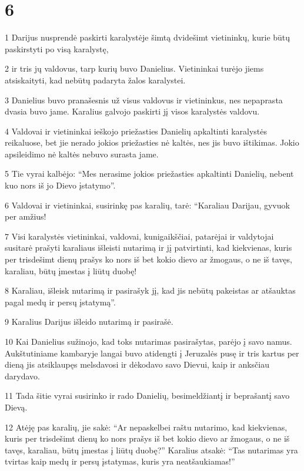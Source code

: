 \chapter{6}


\par 1 Darijus nusprendė paskirti karalystėje šimtą dvidešimt vietininkų, kurie būtų paskirstyti po visą karalystę, 
\par 2 ir tris jų valdovus, tarp kurių buvo Danielius. Vietininkai turėjo jiems atsiskaityti, kad nebūtų padaryta žalos karalystei. 
\par 3 Danielius buvo pranašesnis už visus valdovus ir vietininkus, nes nepaprasta dvasia buvo jame. Karalius galvojo paskirti jį visos karalystės valdovu. 
\par 4 Valdovai ir vietininkai ieškojo priežasties Danielių apkaltinti karalystės reikaluose, bet jie nerado jokios priežasties nė kaltės, nes jis buvo ištikimas. Jokio apsileidimo nė kaltės nebuvo surasta jame. 
\par 5 Tie vyrai kalbėjo: “Mes nerasime jokios priežasties apkaltinti Danielių, nebent kuo nors iš jo Dievo įstatymo”. 
\par 6 Valdovai ir vietininkai, susirinkę pas karalių, tarė: “Karaliau Darijau, gyvuok per amžius! 
\par 7 Visi karalystės vietininkai, valdovai, kunigaikščiai, patarėjai ir valdytojai susitarė prašyti karaliaus išleisti nutarimą ir jį patvirtinti, kad kiekvienas, kuris per trisdešimt dienų prašys ko nors iš bet kokio dievo ar žmogaus, o ne iš tavęs, karaliau, būtų įmestas į liūtų duobę! 
\par 8 Karaliau, išleisk nutarimą ir pasirašyk jį, kad jis nebūtų pakeistas ar atšauktas pagal medų ir persų įstatymą”. 
\par 9 Karalius Darijus išleido nutarimą ir pasirašė. 
\par 10 Kai Danielius sužinojo, kad toks nutarimas pasirašytas, parėjo į savo namus. Aukštutiniame kambaryje langai buvo atidengti į Jeruzalės pusę ir tris kartus per dieną jis atsiklaupęs melsdavosi ir dėkodavo savo Dievui, kaip ir anksčiau darydavo. 
\par 11 Tada šitie vyrai susirinko ir rado Danielių, besimeldžiantį ir beprašantį savo Dievą. 
\par 12 Atėję pas karalių, jie sakė: “Ar nepaskelbei raštu nutarimo, kad kiekvienas, kuris per trisdešimt dienų ko nors prašys iš bet kokio dievo ar žmogaus, o ne iš tavęs, karaliau, būtų įmestas į liūtų duobę?” Karalius atsakė: “Tas nutarimas yra tvirtas kaip medų ir persų įstatymas, kuris yra neatšaukiamas!” 
